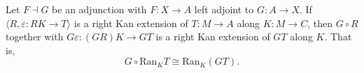 Let $F \dashv G$ be an adjunction with $F: X \to A$ left adjoint to $G: A \to X$. If $\langle R, \varepsilon: RK \to T \rangle$ is a right Kan extension of $T: M \to A$ along $K: M \to C$, then $G \circ R$ together with $G\varepsilon: (GR)K \to GT$ is a right Kan extension of $GT$ along $K$. That is,
$$G \circ \mathrm{Ran}_K T \cong \mathrm{Ran}_K(GT).$$
